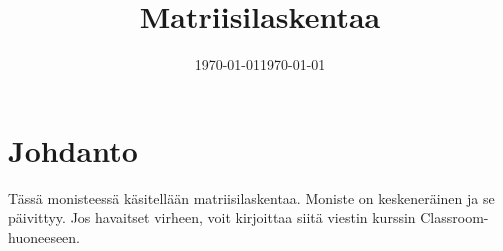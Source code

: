 \documentclass[a4paper, 12pt]{article}
\date{\dmyyyydate\today}
\title{Matriisilaskentaa}
\author{}
\date{\dmyyyydate\today}
\theoremstyle{remark}
\theoremstyle{definition}
\begin{document}
\begin{titlepage}



\maketitle
\thispagestyle{empty}
\end{titlepage}



\clearpage

{}


\tableofcontents

\clearpage
{}
{}%
\section*{Johdanto}
Tässä monisteessä käsitellään matriisilaskentaa. Moniste on keskeneräinen ja se päivittyy. Jos havaitset virheen, voit kirjoittaa siitä viestin kurssin Classroom-huoneeseen.
\clearpage
{}
\end{document}
